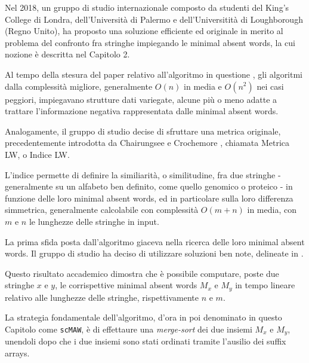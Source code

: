 Nel 2018, un gruppo di studio internazionale composto da studenti del King's College di Londra, dell'Università di Palermo e dell'Universitità di Loughborough (Regno Unito), ha proposto una soluzione efficiente ed originale in merito al problema del confronto fra stringhe impiegando le minimal absent words, la cui nozione è descritta nel Capitolo 2. 

\vspace{3mm}

Al tempo della stesura del paper relativo all'algoritmo in questione \cite{scMAW}, gli algoritmi dalla complessità migliore, generalmente $O(n)$ in media e $O(n^2 )$ nei casi peggiori, impiegavano strutture dati variegate, alcune più o meno adatte a trattare l'informazione negativa rappresentata dalle minimal absent words. 

\vspace{3mm}

Analogamente, il gruppo di studio decise di sfruttare una metrica originale, precedentemente introdotta da Chairungsee e Crochemore \cite{CHAIRUNGSEE2012109}, chiamata Metrica LW, o Indice LW. 

\vspace{3mm}

L'indice permette di definire la similiarità, o similitudine, fra due stringhe - generalmente su un alfabeto ben definito, come quello genomico o proteico - in funzione delle loro minimal absent words, ed in particolare sulla loro differenza simmetrica, generalmente calcolabile con complessità $O(m+n)$ in media, con $m$ e $n$ le lunghezze delle stringhe in input.

\vspace{3mm}

La prima sfida posta dall'algoritmo giaceva nella ricerca delle loro minimal absent words. Il gruppo di studio ha deciso di utilizzare soluzioni ben note, delineate in \cite{maw1}. 

Questo risultato accademico dimostra che è possibile computare, poste due stringhe $x$ e $y$, le corrispettive minimal absent words $M_x$ e $M_y$ in tempo lineare relativo alle lunghezze delle stringhe, rispettivamente $n$ e $m$. 

\vspace{3mm}

La strategia fondamentale dell'algoritmo, d'ora in poi denominato in questo Capitolo come \verb|scMAW|, è di effettaure una \textit{merge-sort} dei due insiemi $M_x$ e $M_y$, unendoli dopo che i due insiemi sono stati ordinati tramite l'ausilio dei suffix arrays. 

